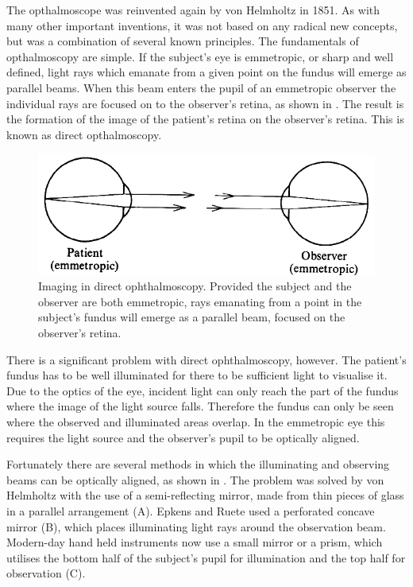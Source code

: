 The opthalmoscope was reinvented again by von Helmholtz in 1851.  As with many
other important inventions, it was not based on any radical new concepts, but
was a combination of several known principles.  The fundamentals of opthalmoscopy
are simple.  If the subject's eye is emmetropic, or sharp and well defined,
light rays which emanate from a given point on the fundus will emerge as parallel
beams.  When this beam enters the pupil of an emmetropic observer the individual
rays are focused on to the observer's retina, as shown in .
The result is the formation of the image of the patient's retina on the observer's
retina. This is known as direct opthalmoscopy.

\begin{figure}[htbp]
\centering
  \includegraphics{figures/direct_opthalmoscopy}
\caption{Imaging in direct ophthalmoscopy. Provided the subject and the observer are both emmetropic, rays emanating from a point in the subject's fundus will emerge as a parallel beam, focused on the observer's retina.\cite{colenbrander2013principles}}
\label{fig:direct_opthal}
\end{figure}

There is a significant problem with direct ophthalmoscopy, however.  The patient's fundus has to be well illuminated for there to be sufficient light to visualise it.  Due to the optics of the eye, incident light can only reach the part of the fundus where the image of the light source falls.  Therefore the fundus can only be seen where the observed and illuminated areas overlap.  In the emmetropic eye this requires the light source and the observer's pupil to be optically aligned.

Fortunately there are several methods in which the illuminating and observing beams can be optically aligned, as shown in .  The problem was solved by von Helmholtz with the use of a semi-reflecting mirror, made from thin pieces of glass in a parallel arrangement (A). Epkens and Ruete used a perforated concave mirror (B), which places illuminating light rays around the observation beam.  Modern-day hand held instruments now use a small mirror or a prism, which utilises the bottom half of the subject's pupil for illumination and the top half for observation (C).

